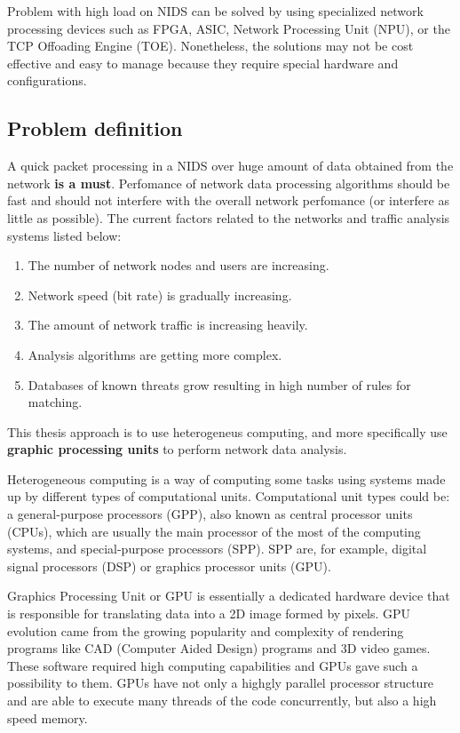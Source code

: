 \documentclass[thesis=M,english]{FITthesis}[2011/07/15]
\begin{document}
Problem with high load on NIDS can be solved by using specialized network processing devices such as FPGA, ASIC, Network Processing Unit (NPU), or the TCP Offoading Engine (TOE). Nonetheless, the solutions may not be cost effective and easy to manage because they require special hardware and configurations.

\subsection*{Problem definition}
A quick packet processing in a NIDS over huge amount of data obtained from the network \textbf{is a must}. Perfomance of network data processing algorithms should be fast and should not interfere with the overall network perfomance (or interfere as little as possible).
The current factors related to the networks and traffic analysis systems listed below:
\begin{enumerate}
\item The number of network nodes and users are increasing. 
\item Network speed (bit rate) is gradually increasing.
\item The amount of network traffic is increasing heavily.
\item Analysis algorithms are getting more complex.
\item Databases of known threats grow resulting in high number of rules for matching.
\end{enumerate}

This thesis approach is to use heterogeneus computing, and more specifically use \textbf{graphic processing units} to perform network data analysis.

Heterogeneous computing is a way of computing some tasks using systems made up by different types of computational units. Computational unit types could be: a general-purpose processors (GPP), also known as central processor units (CPUs), which are usually the main processor of the most of the computing systems, and special-purpose processors (SPP). SPP are, for example, digital signal processors (DSP) or graphics processor units (GPU).

Graphics Processing Unit or GPU is essentially a dedicated hardware device that is responsible for translating data into a 2D image formed by pixels. GPU evolution came from the growing popularity and complexity of rendering programs like CAD (Computer Aided Design) programs and 3D video games. These software required high computing capabilities and GPUs gave such a possibility to them. GPUs have not only a highgly parallel processor structure and are able to execute many threads of the code concurrently, but also a high speed memory.
\end{document}
